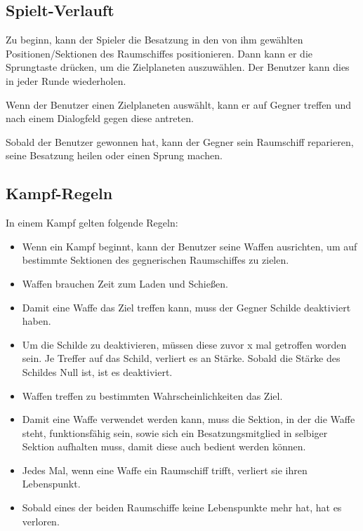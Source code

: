 \documentclass[fontsize=12pt,paper=a4,twoside]{scrartcl}
\begin{document}
\subsection{Spielt-Verlauft}
Zu beginn, kann der Spieler die Besatzung in den von ihm gewählten Positionen/Sektionen des Raumschiffes positionieren. Dann kann er die Sprungtaste drücken, um die Zielplaneten auszuwählen. Der Benutzer kann dies in jeder Runde wiederholen.

Wenn der Benutzer einen Zielplaneten auswählt, kann er auf Gegner treffen und nach einem Dialogfeld gegen diese antreten.

Sobald der Benutzer gewonnen hat,  kann der Gegner sein Raumschiff reparieren, seine Besatzung heilen oder einen Sprung machen.

\subsection{Kampf-Regeln}
In einem Kampf gelten folgende Regeln:
\begin{itemize}
\item Wenn ein Kampf beginnt, kann der Benutzer seine Waffen ausrichten, um auf bestimmte Sektionen des gegnerischen Raumschiffes zu zielen.
 
\item Waffen brauchen Zeit zum Laden und Schießen.

\item Damit eine Waffe das Ziel treffen kann, muss der Gegner Schilde deaktiviert haben.

\item Um die Schilde zu deaktivieren, müssen diese zuvor x mal getroffen worden sein. Je Treffer auf das Schild,  verliert es an Stärke. Sobald die Stärke des Schildes Null ist, ist es deaktiviert.

\item Waffen treffen zu bestimmten Wahrscheinlichkeiten das Ziel.

\item Damit eine Waffe verwendet werden kann, muss die Sektion, in der die Waffe steht, funktionsfähig sein, sowie sich ein Besatzungsmitglied in selbiger Sektion aufhalten muss, damit diese auch bedient werden können.

\item Jedes Mal, wenn eine Waffe ein Raumschiff trifft, verliert sie ihren Lebenspunkt.

\item Sobald eines der beiden Raumschiffe keine Lebenspunkte mehr hat, hat es verloren.
\end{itemize}
\end{document}

